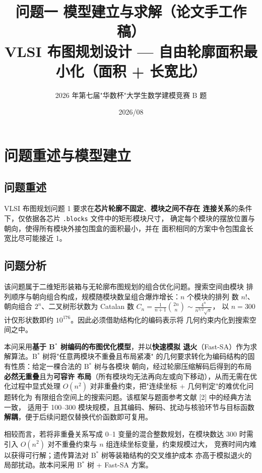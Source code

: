 \documentclass[12pt,a4paper]{article}
\title{\textbf{问题一 模型建立与求解（论文手工作稿）}\\[6pt]
\large VLSI 布图规划设计 --- 自由轮廓面积最小化（面积 + 长宽比）}
\author{2026 年第七届"华数杯"大学生数学建模竞赛 B 题}
\date{2026/08}
\begin{document}
\maketitle
\tableofcontents
\newpage

\section{问题重述与模型建立}

\subsection{问题重述}

VLSI 布图规划问题 1 要求在\textbf{芯片轮廓不固定}、\textbf{模块之间不存在
连接关系}的条件下，仅依据各芯片 \texttt{.blocks} 文件中的矩形模块尺寸，
确定每个模块的摆放位置与朝向，使得所有模块外接包围盒的面积最小，并在
面积相同的方案中令包围盒长宽比尽可能接近 1。

\subsection{问题分析}

该问题属于二维矩形装箱与无轮廓布图规划的组合优化问题。搜索空间由模块
排列顺序与朝向组合构成，规模随模块数呈组合爆炸增长：$n$ 个模块的排列
数 $n!$、朝向组合 $2^n$、二叉树形状数为 Catalan 数
$C_n = \frac{1}{n+1}\binom{2n}{n} \sim \frac{4^n}{n^{3/2}\sqrt{\pi}}$，
以 $n=300$ 计仅形状数即约 $10^{176}$。因此必须借助结构化的编码表示将
几何约束内化到搜索空间之中。

本问采用\textbf{基于 B$^*$ 树编码的布图优化模型}，并以\textbf{快速模拟
退火}（Fast-SA）作为求解算法。B$^*$ 树将"任意两模块不重叠且布局紧凑"
的几何要求转化为编码结构的固有性质：给定一棵合法的 B$^*$ 树与各模块
朝向，经过轮廓压缩解码后得到的布局\textbf{必然无重叠}且为\textbf{可容许
布局}（所有模块均无法再向左或向下移动），从而无需在优化过程中显式处理
$O(n^2)$ 对非重叠约束，把"连续坐标 $+$ 几何判定"的难优化问题转化为
有限组合空间上的搜索问题。该框架与题面参考文献 [2] 中的经典方法一致，
适用于 100--300 模块规模，且其编码、解码、扰动与核验环节与目标函数
\textbf{解耦}，便于后续问题仅替换代价函数即可复用。

相较而言，若将非重叠关系写成 0--1 变量的混合整数规划，在模块数达 300
时需引入 $O(n^2)$ 对不重叠约束与 $n$ 组连续坐标变量，约束规模过大，
竞赛时间内难以获得可行解；遗传算法对 B$^*$ 树等装箱结构的交叉维护成本
亦高于模拟退火的局部扰动。故本问采用 B$^*$ 树 + Fast-SA 方案。
\end{document}
